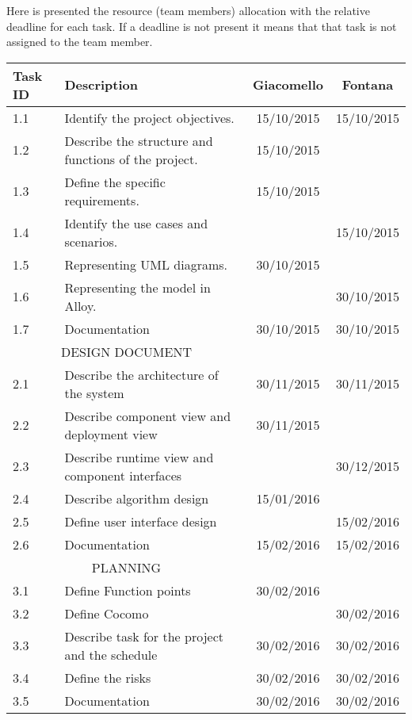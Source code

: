 \documentclass[11pt, a4paper,titlepage]{article}
\begin{document}
	Here is presented the resource (team members) allocation with the relative deadline for each task. If a deadline is not present it means that that task is not assigned to the team member.
	\newline
	\newline
	\begin{tabularx}{\textwidth}{|l|X|c|c|}
		\hline
		\textbf{Task ID} &	\textbf{Description} & \textbf{Giacomello} & \textbf{Fontana} \\
		\hline
		1.1	 & Identify the project objectives. &  15/10/2015 & 15/10/2015 \\
		1.2 & Describe the structure and functions of the project.  & 15/10/2015  &  \\
		1.3 & 	Define the specific requirements. & 15/10/2015  &  \\
		1.4 & 	Identify the use cases and scenarios. &   & 15/10/2015 \\
		1.5 & 	Representing UML diagrams. & 30/10/2015 &  \\
		1.6 & 	Representing the model in Alloy. &   & 30/10/2015 \\
		1.7 & 	Documentation &  30/10/2015 & 30/10/2015 \\
		\hline
		\multicolumn{2}{c}{DESIGN DOCUMENT} &  & \\
		\hline
		2.1 & 	Describe the architecture of the system & 30/11/2015  & 30/11/2015 \\
		2.2 & 	Describe component view and deployment view & 30/11/2015  &  \\
		2.3 & 	Describe runtime view and component interfaces &   & 30/12/2015 \\
		2.4 & 	Describe algorithm design & 15/01/2016  &  \\ 
		2.5 & 	Define user interface design &   & 15/02/2016 \\
		2.6 & 	Documentation & 15/02/2016  & 15/02/2016 \\
		\hline
		\multicolumn{2}{c}{PLANNING} &  & 	\\
		\hline
		3.1 &	Define Function points & 30/02/2016 &  \\
		3.2 & 	Define Cocomo &   & 30/02/2016 \\
		3.3 & 	Describe task for the project and the schedule &  30/02/2016 & 30/02/2016 \\
		3.4 & 	Define the risks & 30/02/2016  & 30/02/2016 \\
		3.5 & 	Documentation & 30/02/2016 & 30/02/2016 \\
		\hline
			\end{tabularx}
\end{document}
